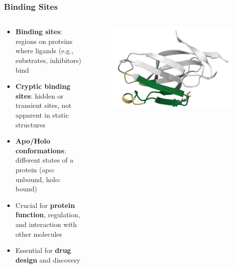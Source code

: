 \documentclass[aspectratio=169]{beamer}
\begin{document}
\begin{frame}
  \frametitle{Binding Sites}

  \begin{columns}
    \begin{column}{0.6\textwidth}
      \begin{itemize}
        \item \textbf{Binding sites}: regions on proteins where ligands (e.g., substrates, inhibitors) bind %
        \item \textbf{Cryptic binding sites}: hidden or transient sites, not apparent in static structures
        \item \textbf{Apo/Holo conformations}: different states of a protein (apo: unbound, holo: bound) %
      \end{itemize}

      \begin{itemize}
        \item Crucial for \textbf{protein function}, regulation, and interaction with other molecules
        \item Essential for \textbf{drug design} and discovery
      \end{itemize}
    \end{column}
    \begin{column}{0.4\textwidth}
      \begin{figure}
        \includegraphics[width=\textwidth]{fig/5eli_color.png}
      \end{figure}
    \end{column}
  \end{columns}

\end{frame}
\end{document}
